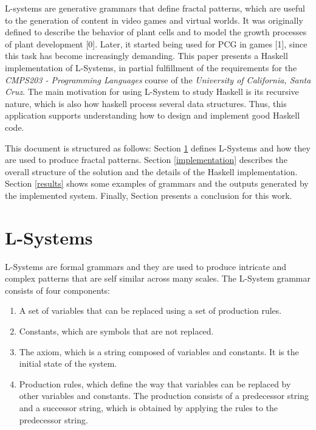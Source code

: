\documentclass{article}
\begin{document}
L-systems are generative grammars that define fractal patterns, which are useful to
the generation of content in video games and virtual worlds. It was originally defined
to describe the behavior of plant cells and to model the growth processes of plant development [0].
Later, it started being used for PCG in games [1], since this task has become increasingly demanding.
This paper presents a Haskell implementation of L-Systems, in partial fulfillment of the requirements for
the \textit{CMPS203 - Programming Languages} course of the \textit{University of California, Santa Cruz}.
The main motivation for using L-System to study Haskell is its recursive nature, which
is also how haskell process several data structures. Thus, this application
supports understanding how to design and implement good Haskell code.

This document is structured as follows: Section \ref{lsystems} defines L-Systems and
how they are used to produce fractal patterns. Section \ref{implementation} describes
the overall structure of the solution and the details of the Haskell implementation.
Section \ref{results} shows some examples of grammars and the outputs
generated by the implemented system. Finally, Section \label{conclusion} presents
a conclusion for this work.

\section{L-Systems}
\label{lsystems}

L-Systems are formal grammars and they are used to produce intricate and complex patterns
that are self similar across many scales. The L-System grammar consists of four components:

\begin{enumerate}
\item A set of variables that can be replaced using a set of production rules.
\item Constants, which are symbols that are not replaced.
\item The axiom, which is a string composed of variables and constants. It is the initial state of the system.
\item Production rules, which define the way that variables can be replaced by other variables and constants.
The production consists of a predecessor string and a successor string, which is obtained by applying the rules
 to the predecessor string.
\end{enumerate}
\end{document}
